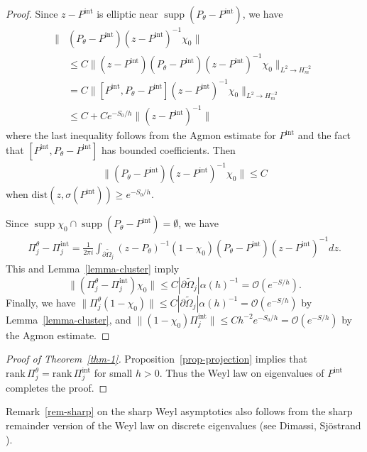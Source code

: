 \documentclass{article}
\theoremstyle{plain}
\theoremstyle{definition}
\theoremstyle{remark}
\newcommand{\supp}{\mathop{\mathrm{supp}}}
\begin{document}
\begin{proof}
Since $z-P^{\mathrm{int}}$ is elliptic near $\supp (P_{\theta}-P^{\mathrm{int}})$, we have 
\begin{align*}
\|&(P_{\theta}-P^{\mathrm{int}})(z-P^{\mathrm{int}})^{-1}\chi_0\|\\
&\le C\|(z-P^{\mathrm{int}})(P_{\theta}-P^{\mathrm{int}})(z-P^{\mathrm{int}})^{-1}\chi_0\|_{L^2\to H_m^{-2}} \\
&= C \|[P^{\mathrm{int}}, P_{\theta}-P^{\mathrm{int}}](z-P^{\mathrm{int}})^{-1}\chi_0\|_{L^2\to H_m^{-2}} \\
&\le C+C e^{-S_0/h}\|(z-P^{\mathrm{int}})^{-1}\|
\end{align*}
where the last inequality follows from the Agmon estimate for $P^{\mathrm{int}}$ 
and the fact that $[P^{\mathrm{int}}, P_{\theta}-P^{\mathrm{int}}]$ has bounded coefficients. 
Then 
\begin{align*}
\|(P_{\theta}-P^{\mathrm{int}})(z-P^{\mathrm{int}})^{-1}\chi_0\|\le C
\end{align*}
when $\mathrm{dist}(z, \sigma(P^{\mathrm{int}}))\ge e^{-S_0/h}$. 

Since $\supp \chi_0\cap \supp (P_{\theta}-P^{\mathrm{int}})=\emptyset$, we have
\begin{align*}
 \Pi_j^{\theta}-\Pi_j^{\mathrm{int}}
=\frac{1}{2\pi i}\int_{\partial \widetilde{\Omega}_j}
(z-P_{\theta})^{-1}(1-\chi_0)(P_{\theta}-P^{\mathrm{int}})(z-P^{\mathrm{int}})^{-1}dz. 
\end{align*}
This and Lemma~\ref{lemma-cluster} imply 
\[
\| \left(\Pi_j^{\theta}- \Pi_j^{\mathrm{int}}\right) \chi_0\|\le C|\partial \widetilde{\Omega}_j| \alpha(h)^{-1} 
=\mathcal{O}(e^{-S/h}).
\] 
Finally, we have $\|\Pi_j^{\theta}(1-\chi_0)\|\le C|\partial \widetilde{\Omega}_j| \alpha(h)^{-1} 
=\mathcal{O}(e^{-S/h})$ by Lemma~\ref{lemma-cluster}, 
and $\|(1-\chi_0)\Pi_j^{\mathrm{int}}\|\le Ch^{-2}e^{-S_0/h}
=\mathcal{O}(e^{-S/h})$ by the Agmon estimate.
\end{proof}

\begin{proof}[Proof of Theorem~\ref{thm-1}]
Proposition~\ref{prop-projection} implies that 
$\mathrm{rank}\,\Pi_j^{\theta}=\mathrm{rank}\,\Pi_j^{\mathrm{int}}$ for small $h>0$.
Thus the Weyl law on eigenvalues of $P^{\mathrm{int}}$ completes the proof.
\end{proof}
Remark~\ref{rem-sharp} on the sharp Weyl asymptotics
 also follows from the sharp remainder version of the Weyl law on discrete eigenvalues 
(see Dimassi, Sj\"{o}strand \cite[Section~10]{DS}). 
\end{document}
